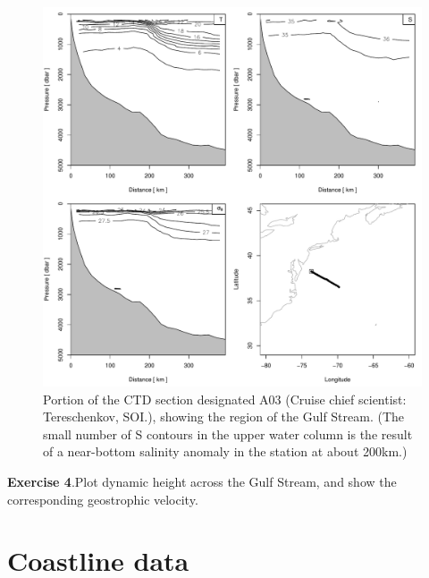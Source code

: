 \documentclass{article}
\newcommand{\workedexercise}[2]{
	\vspace{2ex plus 2ex minus 1ex}
	\begin{boxedminipage}[c]{0.95\linewidth}
		{\textbf{Exercise #1}.\hspace{1em}#2}
	\end{boxedminipage}
	\vspace{2ex plus 2ex minus 1ex}
}
\begin{document}
\begin{figure}
\begin{center}
\includegraphics{oce-sectionfiga03}
\end{center}
\caption{\label{fig:sectiona03}
Portion of the CTD section designated A03 (Cruise chief scientist: Tereschenkov, SOI.), showing the region of the Gulf Stream.  (The small number of S contours
in the upper water column is the result of a near-bottom salinity anomaly
in the station at about 200km.)
}
\end{figure}

\workedexercise{4}{Plot dynamic height across the Gulf Stream, and show the corresponding geostrophic velocity.}

\section{Coastline data}

\end{document}
